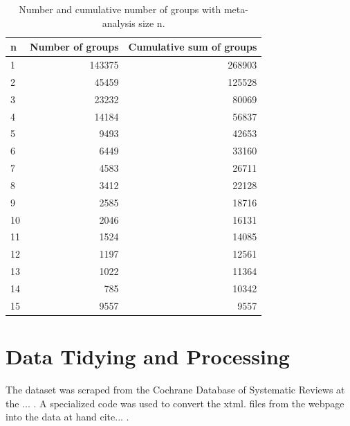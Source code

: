 \documentclass[11pt,a4paper,twoside]{book}\usepackage[]{graphicx}\usepackage[]{color}
\makeatletter
\newenvironment{kframe}{%
 \def\at@end@of@kframe{}%
 \ifinner\ifhmode%
  \def\at@end@of@kframe{\end{minipage}}%
  \begin{minipage}{\columnwidth}%
 \fi\fi%
 \def\FrameCommand##1{\hskip\@totalleftmargin \hskip-\fboxsep
 \colorbox{shadecolor}{##1}\hskip-\fboxsep
     \hskip-\linewidth \hskip-\@totalleftmargin \hskip\columnwidth}%
 \MakeFramed {\advance\hsize-\width
   \@totalleftmargin\z@ \linewidth\hsize
   \@setminipage}}%
 {\par\unskip\endMakeFramed%
 \at@end@of@kframe}
\makeatother
\begin{document}
\begin{kframe}


{\ttfamily\noindent\color{warningcolor}{\#\# Warning: Setting row names on a tibble is deprecated.}}\end{kframe}%
\begin{table}[ht]
\centering
\begingroup\footnotesize
\begin{tabular}{lrr}
  \hline
n & Number of groups & Cumulative sum of groups \\ 
  \hline
1 & 143375 & 268903 \\ 
  2 & 45459 & 125528 \\ 
  3 & 23232 & 80069 \\ 
  4 & 14184 & 56837 \\ 
  5 & 9493 & 42653 \\ 
  6 & 6449 & 33160 \\ 
  7 & 4583 & 26711 \\ 
  8 & 3412 & 22128 \\ 
  9 & 2585 & 18716 \\ 
  10 & 2046 & 16131 \\ 
  11 & 1524 & 14085 \\ 
  12 & 1197 & 12561 \\ 
  13 & 1022 & 11364 \\ 
  14 & 785 & 10342 \\ 
  15 & 9557 & 9557 \\ 
   \hline
\end{tabular}
\endgroup
\caption{Number and cumulative number of groups with meta-analysis size n.} 
\label{repr.groups}
\end{table}


\section{Data Tidying and Processing} \label{sec:Processing}
The dataset was scraped from the Cochrane Database of Systematic Reviews at the ... . A specialized code was used to convert the xtml. files from the webpage into the data at hand cite... . 
\end{document}
